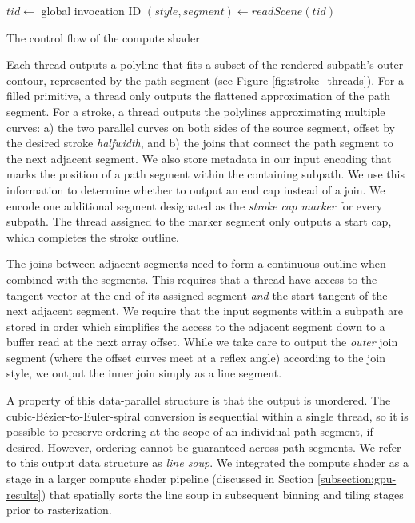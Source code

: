 \documentclass[sigconf, authordraft]{acmart}
\begin{document}
\begin{algorithm}
  $tid \gets$ global invocation ID\;
  $(style, segment) \gets readScene(tid)$\;
\caption{The control flow of the compute shader}
\label{alg:shader-flow}
\end{algorithm}

Each thread outputs a polyline that fits a subset of the rendered subpath's outer contour, represented by the path segment (see Figure \ref{fig:stroke_threads}). For a filled primitive, a thread only outputs the flattened approximation of the path segment. For a stroke, a thread outputs the polylines approximating multiple curves: a) the two parallel curves on both sides of the source segment, offset by the desired stroke \emph{halfwidth}, and b) the joins that connect the path segment to the next adjacent segment. We also store metadata in our input encoding that marks the position of a path segment within the containing subpath. We use this information to determine whether to output an end cap instead of a join. We encode one additional segment designated as the \emph{stroke cap marker} for every subpath. The thread assigned to the marker segment only outputs a start cap, which completes the stroke outline.

The joins between adjacent segments need to form a continuous outline when combined with the segments. This requires that a thread have access to the tangent vector at the end of its assigned segment \emph{and} the start tangent of the next adjacent segment. We require that the input segments within a subpath are stored in order which simplifies the access to the adjacent segment down to a buffer read at the next array offset. While we take care to output the \emph{outer} join segment (where the offset curves meet at a reflex angle) according to the join style, we output the inner join simply as a line segment.

A property of this data-parallel structure is that the output is unordered. The cubic-Bézier-to-Euler-spiral conversion is sequential within a single thread, so it is possible to preserve ordering at the scope of an individual path segment, if desired. However, ordering cannot be guaranteed across path segments. We refer to this output data structure as \emph{line soup}. We integrated the compute shader as a stage in a larger compute shader pipeline (discussed in Section \ref{subsection:gpu-results}) that spatially sorts the line soup in subsequent binning and tiling stages prior to rasterization.
\end{document}
